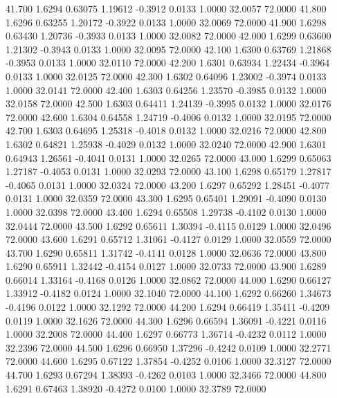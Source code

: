   41.700   1.6294   0.63075   1.19612  -0.3912   0.0133   1.0000  32.0057  72.0000
  41.800   1.6296   0.63255   1.20172  -0.3922   0.0133   1.0000  32.0069  72.0000
  41.900   1.6298   0.63430   1.20736  -0.3933   0.0133   1.0000  32.0082  72.0000
  42.000   1.6299   0.63600   1.21302  -0.3943   0.0133   1.0000  32.0095  72.0000
  42.100   1.6300   0.63769   1.21868  -0.3953   0.0133   1.0000  32.0110  72.0000
  42.200   1.6301   0.63934   1.22434  -0.3964   0.0133   1.0000  32.0125  72.0000
  42.300   1.6302   0.64096   1.23002  -0.3974   0.0133   1.0000  32.0141  72.0000
  42.400   1.6303   0.64256   1.23570  -0.3985   0.0132   1.0000  32.0158  72.0000
  42.500   1.6303   0.64411   1.24139  -0.3995   0.0132   1.0000  32.0176  72.0000
  42.600   1.6304   0.64558   1.24719  -0.4006   0.0132   1.0000  32.0195  72.0000
  42.700   1.6303   0.64695   1.25318  -0.4018   0.0132   1.0000  32.0216  72.0000
  42.800   1.6302   0.64821   1.25938  -0.4029   0.0132   1.0000  32.0240  72.0000
  42.900   1.6301   0.64943   1.26561  -0.4041   0.0131   1.0000  32.0265  72.0000
  43.000   1.6299   0.65063   1.27187  -0.4053   0.0131   1.0000  32.0293  72.0000
  43.100   1.6298   0.65179   1.27817  -0.4065   0.0131   1.0000  32.0324  72.0000
  43.200   1.6297   0.65292   1.28451  -0.4077   0.0131   1.0000  32.0359  72.0000
  43.300   1.6295   0.65401   1.29091  -0.4090   0.0130   1.0000  32.0398  72.0000
  43.400   1.6294   0.65508   1.29738  -0.4102   0.0130   1.0000  32.0444  72.0000
  43.500   1.6292   0.65611   1.30394  -0.4115   0.0129   1.0000  32.0496  72.0000
  43.600   1.6291   0.65712   1.31061  -0.4127   0.0129   1.0000  32.0559  72.0000
  43.700   1.6290   0.65811   1.31742  -0.4141   0.0128   1.0000  32.0636  72.0000
  43.800   1.6290   0.65911   1.32442  -0.4154   0.0127   1.0000  32.0733  72.0000
  43.900   1.6289   0.66014   1.33164  -0.4168   0.0126   1.0000  32.0862  72.0000
  44.000   1.6290   0.66127   1.33912  -0.4182   0.0124   1.0000  32.1040  72.0000
  44.100   1.6292   0.66260   1.34673  -0.4196   0.0122   1.0000  32.1292  72.0000
  44.200   1.6294   0.66419   1.35411  -0.4209   0.0119   1.0000  32.1626  72.0000
  44.300   1.6296   0.66594   1.36091  -0.4221   0.0116   1.0000  32.2008  72.0000
  44.400   1.6297   0.66773   1.36714  -0.4232   0.0112   1.0000  32.2396  72.0000
  44.500   1.6296   0.66950   1.37296  -0.4242   0.0109   1.0000  32.2771  72.0000
  44.600   1.6295   0.67122   1.37854  -0.4252   0.0106   1.0000  32.3127  72.0000
  44.700   1.6293   0.67294   1.38393  -0.4262   0.0103   1.0000  32.3466  72.0000
  44.800   1.6291   0.67463   1.38920  -0.4272   0.0100   1.0000  32.3789  72.0000
